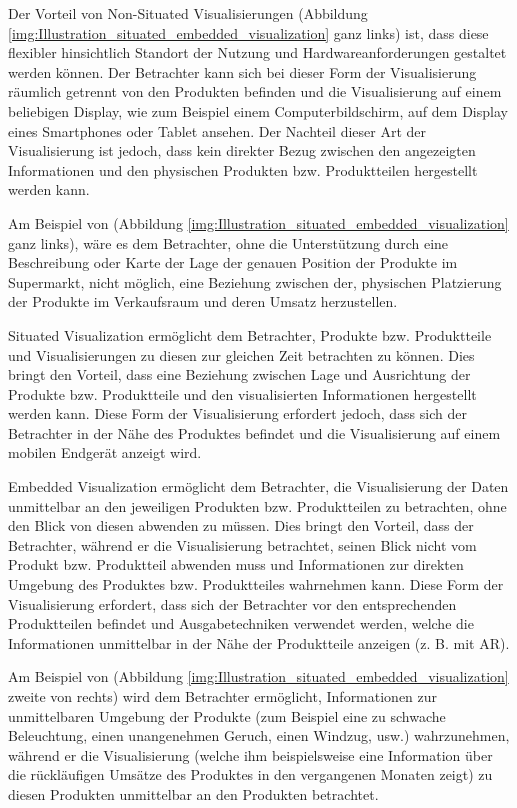 Der Vorteil von Non-Situated Visualisierungen (Abbildung \ref{img:Illustration_situated_embedded_visualization} ganz links) ist, dass diese flexibler hinsichtlich Standort 
der Nutzung und Hardwareanforderungen gestaltet werden können. Der Betrachter kann sich bei dieser Form der Visualisierung räumlich getrennt von den Produkten befinden und die Visualisierung 
auf einem beliebigen Display, wie zum Beispiel einem Computerbildschirm, auf dem Display eines Smartphones oder Tablet ansehen. Der Nachteil dieser Art der Visualisierung ist jedoch, dass kein 
direkter Bezug zwischen den angezeigten Informationen und den physischen Produkten bzw. Produktteilen hergestellt werden kann. 

Am Beispiel von (Abbildung \ref{img:Illustration_situated_embedded_visualization} ganz links), wäre es dem Betrachter, ohne die Unterstützung durch eine Beschreibung oder Karte der Lage der genauen Position der Produkte im Supermarkt, nicht möglich, eine Beziehung zwischen der, physischen Platzierung der Produkte im Verkaufsraum und deren Umsatz herzustellen.

Situated Visualization ermöglicht dem Betrachter, Produkte bzw. Produktteile und Visualisierungen zu diesen zur gleichen Zeit betrachten zu können. Dies bringt den Vorteil, dass eine Beziehung 
zwischen Lage und Ausrichtung der Produkte bzw. Produktteile und den visualisierten Informationen hergestellt werden kann. Diese Form der Visualisierung erfordert jedoch, dass sich 
der Betrachter in der Nähe des Produktes befindet und die Visualisierung auf einem mobilen Endgerät anzeigt wird.

Embedded Visualization ermöglicht dem Betrachter, die Visualisierung der Daten unmittelbar an den jeweiligen Produkten bzw. Produktteilen zu betrachten, ohne den Blick von diesen abwenden zu müssen. 
Dies bringt den Vorteil, dass der Betrachter, während er die Visualisierung betrachtet, seinen Blick nicht vom Produkt bzw. Produktteil abwenden muss und Informationen zur direkten Umgebung des Produktes bzw. Produktteiles wahrnehmen kann. Diese Form der Visualisierung erfordert, dass sich der Betrachter vor den entsprechenden Produktteilen befindet und Ausgabetechniken verwendet werden, welche die Informationen unmittelbar in der Nähe der Produktteile anzeigen (z. B. mit AR).

Am Beispiel von (Abbildung \ref{img:Illustration_situated_embedded_visualization} zweite von rechts) wird dem Betrachter ermöglicht, Informationen zur unmittelbaren Umgebung der Produkte (zum Beispiel eine zu schwache Beleuchtung, einen unangenehmen Geruch, einen Windzug, usw.) wahrzunehmen, während er die Visualisierung (welche ihm beispielsweise eine Information über die rückläufigen Umsätze des Produktes in den vergangenen Monaten zeigt) zu diesen Produkten unmittelbar an den Produkten betrachtet.  

